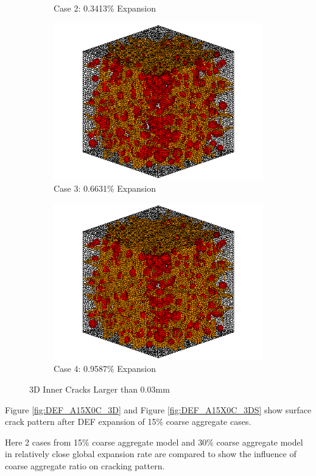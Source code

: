 \begin{figure}[!h]
\begin{subfigure}{.5\textwidth}
    \caption{Case 2: 0.3413\% Expansion}
    \end{subfigure}%
    \begin{subfigure}{.5\textwidth}
      \centering
      \includegraphics[width=.8\linewidth]{Files/exp_3D/DEF/A15X0C_3_c.png}
    \caption{Case 3: 0.6631\% Expansion}
    \end{subfigure}
    \begin{subfigure}{.5\textwidth}
      \centering
      \includegraphics[width=.8\linewidth]{Files/exp_3D/DEF/A15X0C_4_c.png}
    \caption{Case 4: 0.9587\% Expansion}
    \end{subfigure}%

  \caption{3D Inner Cracks Larger than 0.03mm}
  \label{fig:DEF_A15X0C_crack}
\end{figure}

Figure \ref{fig:DEF_A15X0C_3D} and Figure \ref{fig:DEF_A15X0C_3DS} show surface crack pattern after DEF expansion of 15\% coarse aggregate cases.

Here 2 cases from 15\% coarse aggregate model and 30\% coarse aggregate model in relatively close global expansion rate are compared to show the influence of coarse aggregate ratio on cracking pattern.

